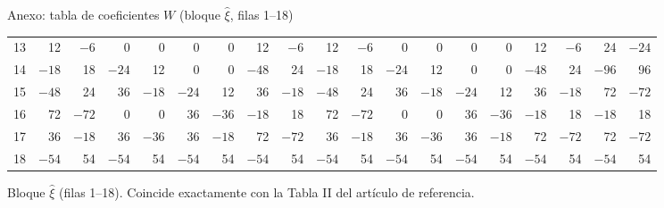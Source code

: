 \documentclass{beamer}
\begin{document}
\begin{frame}{Anexo: tabla de coeficientes $W$ (bloque $\hat\xi$, filas 1--18)}
\begin{center}
{\begin{tabular}{r|rrrrrrrrrrrrrrrrrr}
      \tiny 13 & 12 & $-6$ & 0 & 0 & 0 & 0 & 12 & $-6$ & 12 & $-6$ & 0 & 0 & 0 & 0 & 12 & $-6$ & 24 & $-24$\\
      \tiny 14 & $-18$ & 18 & $-24$ & 12 & 0 & 0 & $-48$ & 24 & $-18$ & 18 & $-24$ & 12 & 0 & 0 & $-48$ & 24 & $-96$ & 96\\
      \tiny 15 & $-48$ & 24 & 36 & $-18$ & $-24$ & 12 & 36 & $-18$ & $-48$ & 24 & 36 & $-18$ & $-24$ & 12 & 36 & $-18$ & 72 & $-72$\\
      \tiny 16 & 72 & $-72$ & 0 & 0 & 36 & $-36$ & $-18$ & 18 & 72 & $-72$ & 0 & 0 & 36 & $-36$ & $-18$ & 18 & $-18$ & 18\\
      \tiny 17 & 36 & $-18$ & 36 & $-36$ & 36 & $-18$ & 72 & $-72$ & 36 & $-18$ & 36 & $-36$ & 36 & $-18$ & 72 & $-72$ & 72 & $-72$\\
      \tiny 18 & $-54$ & 54 & $-54$ & 54 & $-54$ & 54 & $-54$ & 54 & $-54$ & 54 & $-54$ & 54 & $-54$ & 54 & $-54$ & 54 & $-54$ & 54\\
    \end{tabular}}
  \end{center}
  \vspace{-0.1cm}
  {\scriptsize Bloque $\hat\xi$ (filas 1--18). Coincide exactamente con la
  Tabla II del artículo de referencia.}
\end{frame}
\end{document}
